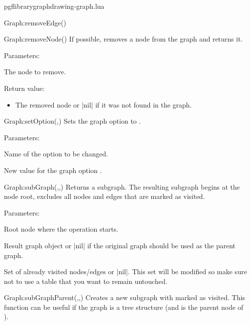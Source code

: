 \begin{filedescription}{pgflibrarygraphdrawing-graph.lua}
\begin{luacommand}{{Graph:removeEdge}()}
\end{luacommand}\begin{luacommand}{{Graph:removeNode}()}
If possible, removes a node from the graph and returns it. 

Parameters:
\begin{parameterdescription}
	\item[\meta{node}] The node to remove. 
\end{parameterdescription}


Return value:
\begin{itemize} \item[] The removed node or |nil| if it was not found in the graph.  \end{itemize}


\end{luacommand}\begin{luacommand}{{Graph:setOption}(,)}
Sets the graph option  to . 

Parameters:
\begin{parameterdescription}
	\item[\meta{name}] Name of the option to be changed.\item[\meta{value}] New value for the graph option . 
\end{parameterdescription}



\end{luacommand}\begin{luacommand}{{Graph:subGraph}(,,)}
Returns a subgraph.  The resulting subgraph begins at the node root, excludes all nodes and edges that are marked as visited. 

Parameters:
\begin{parameterdescription}
	\item[\meta{root}] Root node where the operation starts.\item[\meta{graph}] Result graph object or |nil| if the original graph should be used as the parent graph.\item[\meta{visited}] Set of already visited nodes/edges or |nil|. This set will be modified so make sure not to use a table that you want to remain untouched. 
\end{parameterdescription}



\end{luacommand}\begin{luacommand}{{Graph:subGraphParent}(,,)}
Creates a new subgraph with  marked as visited.  This function can be useful if the graph is a tree structure (and  is the parent node of ). 


\end{luacommand}
\end{filedescription}

